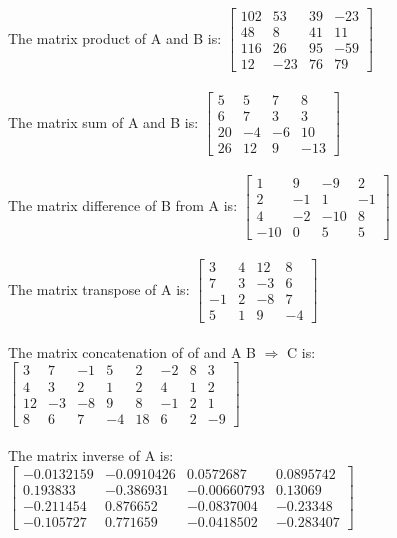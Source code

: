 The matrix product of A and B is: $\begin{bmatrix}
102 & 53 & 39 & -23 \\48 & 8 & 41 & 11 \\116 & 26 & 95 & -59 \\12 & -23 & 76 & 79
\end{bmatrix}$\\
\\
The matrix sum of A and B is: $\begin{bmatrix}
5 & 5 & 7 & 8 \\6 & 7 & 3 & 3 \\20 & -4 & -6 & 10 \\26 & 12 & 9 & -13
\end{bmatrix}$\\
\\
The matrix difference of B from A is: $\begin{bmatrix}
1 & 9 & -9 & 2 \\2 & -1 & 1 & -1 \\4 & -2 & -10 & 8 \\-10 & 0 & 5 & 5
\end{bmatrix}$\\
\\
The matrix transpose of A is: $\begin{bmatrix}
3 & 4 & 12 & 8 \\7 & 3 & -3 & 6 \\-1 & 2 & -8 & 7 \\5 & 1 & 9 & -4
\end{bmatrix}$\\
\\
The matrix concatenation of of and A B $\Rightarrow$ C is: $\begin{bmatrix}
3 & 7 & -1 & 5 & 2 & -2 & 8 & 3 \\4 & 3 & 2 & 1 & 2 & 4 & 1 & 2 \\12 & -3 & -8 & 9 & 8 & -1 & 2 & 1 \\8 & 6 & 7 & -4 & 18 & 6 & 2 & -9
\end{bmatrix}$\\
\\
The matrix inverse of A is: $\begin{bmatrix}
-0.0132159 & -0.0910426 & 0.0572687 & 0.0895742 \\0.193833 & -0.386931 & -0.00660793 & 0.13069 \\-0.211454 & 0.876652 & -0.0837004 & -0.23348 \\-0.105727 & 0.771659 & -0.0418502 & -0.283407
\end{bmatrix}$\\
